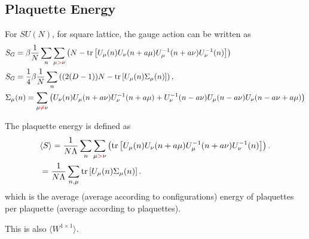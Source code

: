 \subsection{\label{PlaquetteEnergy}Plaquette Energy}

For $SU(N)$, for square lattice, the gauge action can be written as
\begin{equation}
\begin{split}
&S_G=\beta\frac{1}{N}\sum _{n} \sum _{\mu \textcolor[rgb]{1,0,0}{>}\nu} \left(N-{\rm tr}\left[U_{\mu}(n)U_{\nu}(n+a\mu)U^{-1}_{\mu}(n+a\nu)U^{-1}_{\nu}(n)\right]\right)\\
&S_G=\frac{1}{4}\beta\frac{1}{N}\sum _{n}  \left((2(D-1))N-{\rm tr}\left[U_{\mu}(n)\Sigma _{\mu}(n)\right]\right),\\
&\Sigma _{\mu}(n)=\sum _{\mu \textcolor[rgb]{1,0,0}{\neq}\nu}\left(U_{\nu}(n)U_{\mu}(n+a\nu)U^{-1}_{\nu}(n+a\mu)+U^{-1}_{\nu}(n-a\nu)U_{\mu}(n-a\nu)U_{\nu}(n-a\nu+a\mu)\right)\\
\end{split}
\label{eq.plaqutteEnergy.staple}
\end{equation}

The plaquette energy is defined as
\begin{equation}
\begin{split}
&\langle S\rangle =\frac{1}{N\Lambda}\sum _{n} \sum _{\mu \textcolor[rgb]{1,0,0}{>}\nu} \left({\rm tr}\left[U_{\mu}(n)U_{\nu}(n+a\mu)U^{-1}_{\mu}(n+a\nu)U^{-1}_{\nu}(n)\right]\right).\\
&=\frac{1}{N\Lambda}\sum _{n,\mu}{\rm tr}\left[U_{\mu}(n)\Sigma _{\mu}(n)\right].\\
\end{split}
\end{equation}
which is the average (average according to configurations) energy of plaquettes per plaquette (average according to plaquettes).

This is also $\langle W ^{1\times 1}\rangle$.
